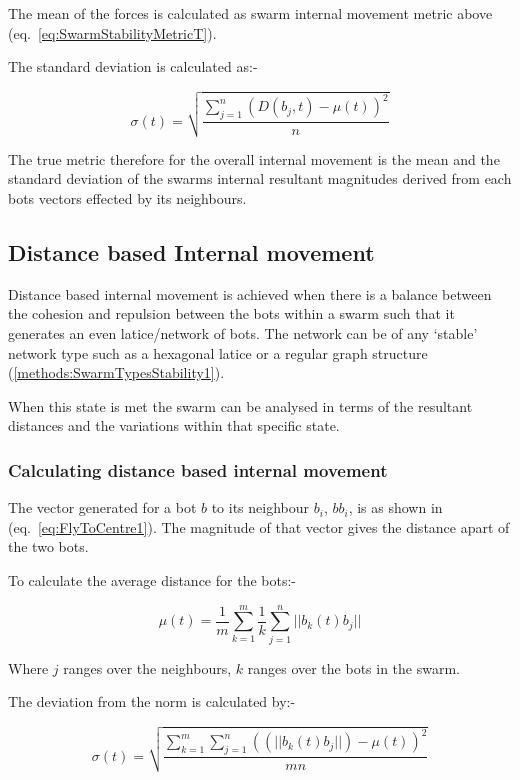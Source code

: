 \documentclass[10pt,journal,letterpaper,twoside]{IEEEtran}
\newcommand{\stability}{internal movement}
\newcommand{\Stability}{Internal movement}
\newcommand{\Eq}{eq.}
\begin{document}
The mean of the forces is calculated as swarm \stability{} metric above
(\Eq{}~\ref{eq:SwarmStabilityMetricT}).

The standard deviation is calculated as:-

\begin{equation}
\label{eq:SwarmStabilityQuotientT}
\sigma(t) = \sqrt{\frac{\sum_{j=1}^{n}(D(b_j,t)-\mu(t))^2}{n}}
\end{equation}

The true metric therefore for the overall \stability{} is the mean and the standard deviation of the swarms internal resultant magnitudes derived from each bots vectors effected by its neighbours.

\subsection{Distance based \Stability{}}

Distance based \stability{} is achieved when there is a balance between the cohesion and repulsion between the bots within a swarm such that it generates an even latice/network of bots. The network can be of any `stable' network type such as a hexagonal latice or a regular graph structure (\ref{methods:SwarmTypesStability1}).

When this state is met the swarm can be analysed in terms of the resultant distances and the variations within that specific state.

\subsubsection{Calculating distance based \stability{}}

The vector generated for a bot $b$ to its neighbour $b_i$, $bb_i$, is as shown in (\Eq{}~\ref{eq:FlyToCentre1}). The magnitude of that vector gives the distance apart of the two bots.

To calculate the average distance for the bots:-

\begin{equation}
\label{eq:SwarmStabilityDistance1}
\mu(t) = \frac{1}{m}{\sum_{k=1}^{m}}\frac{1}{k}{\sum_{j=1}^{n}||b_k(t)b_j||}
\end{equation}

Where $j$ ranges over the neighbours, $k$ ranges over the bots in the swarm.

The deviation from the norm is calculated by:-

\begin{equation}
\label{eq:SwarmStabilityQuotientT}
\sigma(t) = \sqrt{\frac{\sum_{k=1}^{m}\sum_{j=1}^{n}((||b_k(t)b_j||)-\mu(t))^2}{mn}}
\end{equation}
\end{document}
